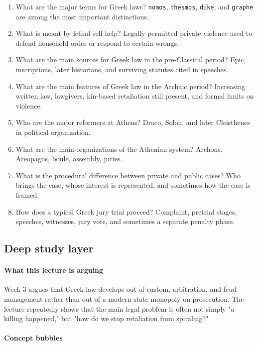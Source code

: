\documentclass[11pt]{article}
\begin{document}
\begin{enumerate}
\item What are the major terms for Greek laws? \texttt{nomos}, \texttt{thesmos}, \texttt{dike}, and \texttt{graphe} are among the most important distinctions.
\item What is meant by lethal self-help? Legally permitted private violence used to defend household order or respond to certain wrongs.
\item What are the main sources for Greek law in the pre-Classical period? Epic, inscriptions, later historians, and surviving statutes cited in speeches.
\item What are the main features of Greek law in the Archaic period? Increasing written law, lawgivers, kin-based retaliation still present, and formal limits on violence.
\item Who are the major reformers at Athens? Draco, Solon, and later Cleisthenes in political organization.
\item What are the main organizations of the Athenian system? Archons, Areopagus, boule, assembly, juries.
\item What is the procedural difference between private and public cases? Who brings the case, whose interest is represented, and sometimes how the case is framed.
\item How does a typical Greek jury trial proceed? Complaint, pretrial stages, speeches, witnesses, jury vote, and sometimes a separate penalty phase.
\end{enumerate}

\subsection{Deep study layer}

\paragraph{What this lecture is arguing}

Week 3 argues that Greek law develops out of custom, arbitration, and feud management rather than out of a modern state monopoly on prosecution. The lecture repeatedly shows that the main legal problem is often not simply "a killing happened," but "how do we stop retaliation from spiraling?"

\paragraph{Concept bubbles}
\end{document}
